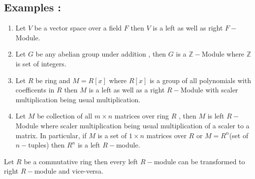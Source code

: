 \subsection{Examples :}

\begin{enumerate}
\item Let $V$ be a vector space over a field $F$ then $V$ is a left as well as right $F-$Module.\newline \bigskip
\item Let $G$ be any abelian group under addition , then $G$ is a $\mathbb{Z-}$Module where $\mathbb{Z}$ is set of integers.\newline \bigskip
\item Let $R$ be ring and $M= R[x]$  where $R[x]$ is a group of all polynomials with coefficents in $R$ then $M$ is a left as well as a right $R-$Module with scaler multiplication being usual multiplication.\newline \bigskip
\item Let $M$ be collection of all $m \times n $ matrices over ring $R$ , then $M$ is left $R-$Module where scaler multiplication being usual multiplication of a scaler to a matrix. \newline
\bigskip
In particular, if $M$ is a set of $1 \times n$ matrices over $R$ or $M = R^n$(set of $n-$tuples) then $R^n$ is a left $R-$module.

\end{enumerate}
\bigskip

\begin{remark}
	Let $R$ be a commutative ring then every left $R-$module can be transformed to right $R-$module and vice-versa.
	
\end{remark}


